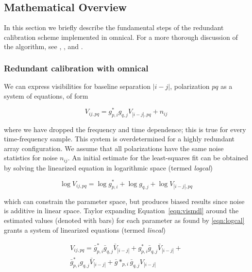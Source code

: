 \subsection{Mathematical Overview}
\label{sec:polcal_math}

In this section we briefly describe the fundamental steps of the redundant calibration scheme implemented in {\sc omnical}. For a more thorough discussion of the algorithm, see \citet{Wieringa.92}, \citet{Liu.10}, \citet{Zheng.14} and \citet{Dillon.17}. 

\subsubsection{Redundant calibration with {\sc omnical}}

We can express visibilities for baseline separation $|i-j|$, polarization $pq$ as a system of equations, of form

\begin{equation}
V_{ij,pq} = g^*_{p,i} g_{q,j} V_{|i-j|,pq} + n_{ij}
\label{eqn:vismdl}
\end{equation}

where we have dropped the frequency and time dependence; this is true for every time-frequency sample. This system is overdetermined for a highly redundant array configuration. We assume that all polarizations have the same noise statistics for noise $n_{ij}$. An initial estimate for the least-squares fit can be obtained by solving the linearized equation in logarithmic space (termed \textit{logcal})

\begin{equation}
\log V_{ij,pq} = \log g^*_{p,i} + \log g_{q,j} + \log V_{|i-j|,pq}
\label{eqn:logcal}
\end{equation}

which can constrain the parameter space, but produces biased results since noise is additive in linear space. Taylor expanding Equation~\ref{eqn:vismdl} around the estimated values (denoted with bars) for each parameter as found by \ref{eqn:logcal} grants a system of linearized equations (termed \textit{lincal})

\begin{eqnarray}
V_{ij,pq} = \bar{g}^*_{p,i} \bar{g}_{q,j} \bar{V}_{|i-j|} + g^*_{p,i} \bar{g}_{q,j} \bar{V}_{|i-j|} + \nonumber\\
 \bar{g}^*_{p,i} g_{q,j} \bar{V}_{|i-j|} + \bar{g}*_{p,i} \bar{g}_{q,j} V_{|i-j|}
\end{eqnarray} 

